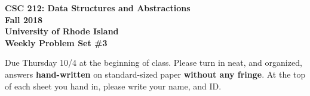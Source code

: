 \documentclass[11pt]{article}
\begin{document}
\thispagestyle{empty}

\begin{center}
    {\Large\bf CSC 212: Data Structures and Abstractions}\\
    \medskip
    {\Large\bf Fall 2018}\\
    \medskip
    {\Large\bf University of Rhode Island}\\
    \bigskip
    {\Large\bf Weekly Problem Set \#3}
\end{center}

Due Thursday 10/4 at the beginning of class. Please turn in neat, and organized, answers \textbf{hand-written} on standard-sized paper \textbf{without any fringe}. At the top of each sheet you hand in, please write your name, and ID.
\end{document}
